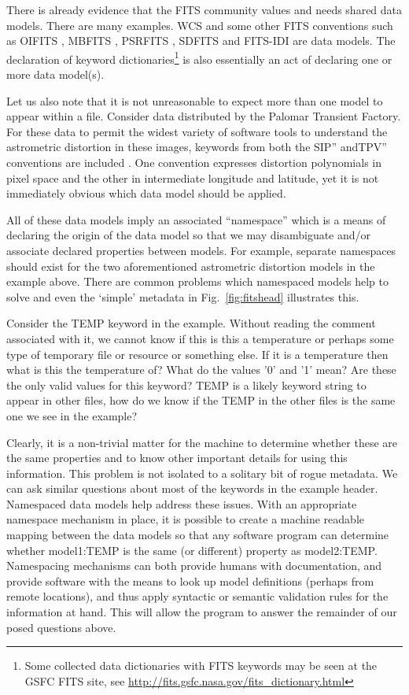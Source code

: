 \documentclass[final,authoryear,5p,times,twocolumn]{elsarticle}
\begin{document}
{{There is already evidence that the FITS community values and needs shared
data models. There are many examples. WCS and some other FITS conventions
such as OIFITS
\citep{2006SPIE.6268E.106T}, MBFITS \citep{2006A&A...454L..25M},
PSRFITS \citep{2004PASA...21..302H},
SDFITS \citep{2000ASPC..216..243G} and FITS-IDI \citep{2011AIPS114}
are data models. The declaration of keyword
dictionaries\footnote{Some collected data dictionaries with FITS
keywords may be seen at the GSFC FITS site, see
\url{http://fits.gsfc.nasa.gov/fits\_dictionary.html}} is also essentially
an act of declaring one or more data model(s).

Let us also note that it is not unreasonable to expect more than one model 
to appear within a file. Consider data distributed by the Palomar Transient 
Factory.  For these data to permit the widest
variety of software tools to understand the astrometric distortion in these
images, keywords from both the SIP'' andTPV'' conventions are included
\citep{2012SPIE.8451E..1MS}.
One convention expresses distortion polynomials in pixel space and the
other in intermediate longitude and latitude, yet it is not immediately
obvious which data model should be applied.
 

All of these data models imply an associated ``namespace'' which is
a means of declaring the origin of the data model so that we may
disambiguate and/or associate declared properties between models.
For example, separate namespaces should exist for the two aforementioned 
astrometric distortion models in the example above.
There are common problems which namespaced models help to solve and even
the `simple' metadata in Fig.~\ref{fig:fitshead} illustrates this.


Consider the TEMP keyword in the example. Without reading the comment
associated with it, we cannot know if this is this a temperature or perhaps
some type of temporary file or resource or something else. If it is a
temperature then what is this the temperature of? What do the values '0'
and '1' mean? Are these the only valid values for this keyword?  TEMP is
a likely keyword string to appear in other files, how do we know if the
TEMP in the other files is the same one we see in the example?


Clearly, it is a non-trivial matter for the machine to determine whether
these are the same properties and to know other important details for using
this information. This problem is not isolated to a solitary bit
of rogue metadata. We can ask similar questions about most of the keywords
in the example header. Namespaced data models help address these issues. With
an appropriate namespace mechanism in place, it is possible to create a
machine readable mapping between the data models so that any software program
can determine whether model1:TEMP is the same (or different) property as
model2:TEMP. 
Namespacing mechanisms can both provide humans with documentation, and 
provide software with the means to look up model definitions (perhaps from 
remote locations), and thus apply syntactic or semantic validation rules 
for the information at hand.  This will allow the program to
answer the remainder of our posed questions above.


}}
\end{document}
